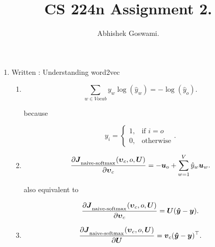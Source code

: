 \documentclass[]{article}
\begin{document}
\title{CS 224n Assignment 2.}
\author{Abhishek Goswami.}
\maketitle

\begin{enumerate}
	\item Written : Understanding word2vec
	
	\begin{enumerate}
		
		\item
		\begin{equation}
		\sum_{w \in Vocab} y_w \log(\hat{y}_w) = - \log(\hat{y}_o).
		\end{equation}

		because
		
		\begin{equation}
		y_{i} = 
\begin{cases}
    1, & \text{if } i = o\\
    0, & \text{otherwise}
\end{cases}.
		\end{equation}
			
		\item
		\begin{equation}
		{\partial 		\boldsymbol{J}_\textsubscript{naive-softmax}(\boldsymbol{\upsilon}_c, o, \boldsymbol{U}) \over \partial \boldsymbol{\upsilon}_c} = 
		- \boldsymbol{u}_{o} + \sum_{w=1}^V \hat{y}_w \boldsymbol{u}_{w}.
		\end{equation}

		also equivalent to 
		
		\begin{equation}
		{\partial 		\boldsymbol{J}_\textsubscript{naive-softmax}(\boldsymbol{\upsilon}_c, o, \boldsymbol{U}) \over \partial \boldsymbol{\upsilon}_c} = 
		\boldsymbol{U} (\boldsymbol{\hat{y}} - \boldsymbol{y}).
		\end{equation}
		
		\item
		\begin{equation}
		{\partial 		\boldsymbol{J}_\textsubscript{naive-softmax}(\boldsymbol{\upsilon}_c, o, \boldsymbol{U}) \over \partial \boldsymbol{U}} = 
		\boldsymbol{v}_{c} (\boldsymbol{\hat{y}} - \boldsymbol{y})^\top.
		\end{equation}
	

\end{enumerate}
\end{enumerate}
\end{document}
